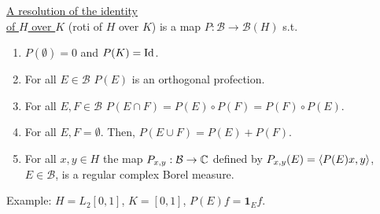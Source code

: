 \documentclass{article}
\begin{document}
\begin{boxdef}\label{def: roti}
\noindent\underline{A resolution of the identity}\\ \noindent\underline{of $H$ over $K$} (roti of $H$ over $K$) is a map $P:\mathcal{B}\to\mathcal{B}(H)$ s.t.
    \begin{enumerate}[label = (\roman*), align = left]
        \item $P(\emptyset)=0$ and $P(K)=\operatorname{Id}$.
        \item For all $E\in \mathcal{B}$ $P(E)$ is an orthogonal profection.
        \item For all $E,F\in \mathcal{B}$ $P(E\cap F)=P(E)\circ P(F) = P(F)\circ P(E)$.
        \item For all $E,F=\emptyset$. Then, $P(E\displaystyle\cup F)=P(E) + P(F)$.
        \item For all $x,y\in H$ the map $P_{x,y}:\mathcal{B}\to \mathbb{C}$ defined by $P_{x,y}(E) = \langle P(E)x, y\rangle$, $E\in \mathcal{B}$, is a regular complex Borel measure.
    \end{enumerate}
\end{boxdef}

\begin{examplesblock}{Example:}\label{examples: 14}
    $H = L_2[0,1]$, $K = [0,1]$, $P(E)f=\mathbf{1}_Ef$.
\end{examplesblock}
\end{document}
